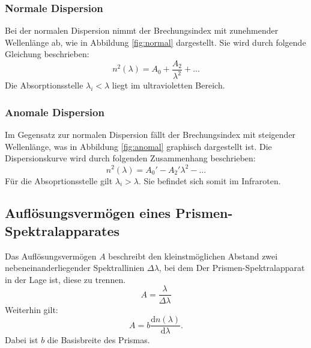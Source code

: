 \subsubsection{Normale Dispersion}
Bei der normalen Dispersion nimmt der Brechungsindex mit zunehmender Wellenlänge ab, wie in Abbildung \ref{fig:normal} dargestellt. Sie wird durch folgende Gleichung beschrieben:
\begin{equation}
  n^2(\lambda)=A_0+\frac{A_2}{\lambda^2}+...
\end{equation}
Die Absorptionsstelle $\lambda_i < \lambda$ liegt im ultravioletten Bereich.

\subsubsection{Anomale Dispersion}
Im Gegensatz zur normalen Dispersion fällt der Brechungsindex mit steigender Wellenlänge, was in Abbildung \ref{fig:anomal} graphisch dargestellt ist.
Die Dispersionskurve wird durch folgenden Zusammenhang beschrieben:
\begin{equation}
  n^2(\lambda)=A_0'-A_2'\lambda^2-...
\end{equation}
Für die Absoprtionsstelle gilt $\lambda_i>\lambda$. Sie befindet sich somit im Infraroten.

\subsection{Auflösungsvermögen eines Prismen-Spektralapparates}
Das Auflösungsvermögen $A$ beschreibt den kleinstmöglichen Abstand zwei nebeneinanderliegender Spektrallinien $\Delta \lambda$, bei dem Der Prismen-Spektralapparat in der Lage ist, diese zu trennen.
\begin{equation}
  \label{eqn:A1}
  A=\frac{\lambda}{\Delta \lambda}
\end{equation}
Weiterhin gilt:
\begin{equation}
  \label{eqn:A2}
 A=b \frac{\mathrm{d}n(\lambda)}{\mathrm{d}\lambda}.
\end{equation}
Dabei ist $b$ die Basisbreite des Prismas.
